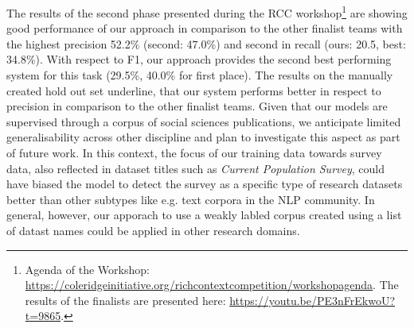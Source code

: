 The results of the second phase presented during the RCC workshop\footnote{
    Agenda of the Workshop: 
    \url{https://coleridgeinitiative.org/richcontextcompetition/workshopagenda}.
    The results of the finalists are presented here: 
    \url{https://youtu.be/PE3nFrEkwoU?t=9865}.
}
are showing good performance of our approach in comparison to the other finalist teams with the highest precision 52.2\% (second: 47.0\%) and second in recall (ours: 20.5, best: 34.8\%).
With respect to F1, our approach provides the second best performing system for this task (29.5\%, 40.0\% for first place).
The results on the manually created hold out set underline, that our system performs better in respect to precision in comparison to the other finalist teams.
Given that our models are supervised through a corpus of social sciences publications, we anticipate limited generalisability across other discipline and plan to investigate this aspect as part of future work. In this context, the focus of our training data towards survey data, also reflected in dataset titles such as \textit{Current Population Survey}, could have biased the model to detect the survey as a specific type of research datasets better than other subtypes like e.g. text corpora in the NLP community.
In general, however, our apporach to use a weakly labled corpus created using a list of datast names could be applied in other research domains.
\begin{comment}
* limitations\
**    Performance is difficult to measure\\
**    Ground truth needed to have a good measure\\
**    During development a ground truth holdout set would have prevented the feeling to fish in troubled waters.\\
\end{comment}

